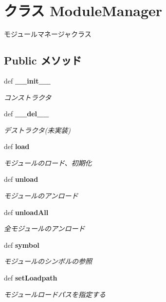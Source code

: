 \section{クラス ModuleManager}
\label{classsource__py_1_1_module_manager_1_1_module_manager}
モジュールマネージャクラス  


\subsection*{Public メソッド}
\begin{CompactItemize}
\item 
def {\bf \_\-\_\-init\_\-\_\-}
\begin{CompactList}\small\item\em コンストラクタ \item\end{CompactList}\item 
def {\bf \_\-\_\-del\_\-\_\-}
\begin{CompactList}\small\item\em デストラクタ(未実装) \item\end{CompactList}\item 
def {\bf load}
\begin{CompactList}\small\item\em モジュールのロード、初期化 \item\end{CompactList}\item 
def {\bf unload}
\begin{CompactList}\small\item\em モジュールのアンロード \item\end{CompactList}\item 
def {\bf unloadAll}
\begin{CompactList}\small\item\em 全モジュールのアンロード \item\end{CompactList}\item 
def {\bf symbol}
\begin{CompactList}\small\item\em モジュールのシンボルの参照 \item\end{CompactList}\item 
def {\bf setLoadpath}
\begin{CompactList}\small\item\em モジュールロードパスを指定する \item\end{CompactList}\item 

\end{CompactItemize}
